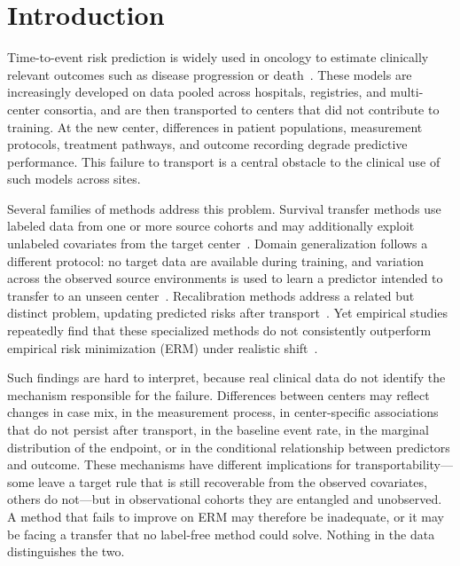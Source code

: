 \section{Introduction}

Time-to-event risk prediction is widely used in oncology to estimate clinically
relevant outcomes such as disease progression or
death~\cite{delgado2021clinicalendpoints}. These models are increasingly
developed on data pooled across hospitals, registries, and multi-center
consortia, and are then transported to centers that did not contribute to
training. At the new center, differences in patient populations, measurement
protocols, treatment pathways, and outcome recording degrade predictive
performance. This failure to transport is a central obstacle to the clinical
use of such models across sites.

Several families of methods address this problem. Survival transfer methods use
labeled data from one or more source cohorts and may additionally exploit
unlabeled covariates from the target
center~\cite{shaker2023multisource,Bel19,li2023transfer}. Domain generalization
follows a different protocol: no target data are available during training, and
variation across the observed source environments is used to learn a predictor
intended to transfer to an unseen center~\cite{pfisterer2022evaluating,
fan2024stablecox}. Recalibration methods address a related but distinct problem,
updating predicted risks after transport~\cite{ye2025multicalibration}. Yet
empirical studies repeatedly find that these specialized methods do not
consistently outperform empirical risk minimization (ERM) under realistic
shift~\cite{gulrajani2021search,koh2021wilds,guo2022evaluation,zhang2021empirical}.

Such findings are hard to interpret, because real clinical data do not identify
the mechanism responsible for the failure. Differences between centers may
reflect changes in case mix, in the measurement process, in center-specific
associations that do not persist after transport, in the baseline event rate, in
the marginal distribution of the endpoint, or in the conditional relationship
between predictors and outcome. These mechanisms have different implications for
transportability---some leave a target rule that is still recoverable from the
observed covariates, others do not---but in observational cohorts they are
entangled and unobserved. A method that fails to improve on ERM may therefore be
inadequate, or it may be facing a transfer that no label-free method could
solve. Nothing in the data distinguishes the two.

